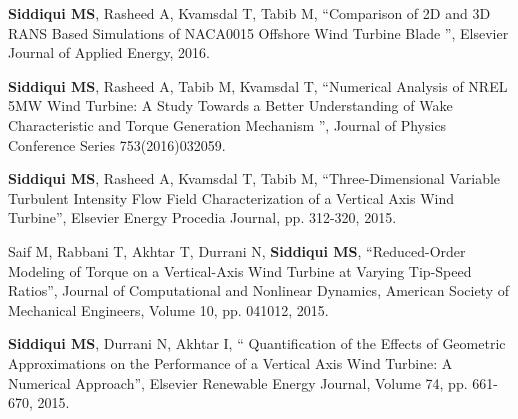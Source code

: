 \begin{cventries}
{\begin{cvitems}
			\item{\textbf{Siddiqui MS}, Rasheed A, Kvamsdal T, Tabib M, “Comparison of 2D and 3D RANS Based Simulations of NACA0015 Offshore Wind Turbine Blade  ”, Elsevier Journal of Applied Energy, 2016.}
			\item{\textbf{Siddiqui MS}, Rasheed A, Tabib M, Kvamsdal T, “Numerical Analysis of NREL 5MW Wind Turbine: A Study Towards a Better Understanding of Wake Characteristic and Torque Generation Mechanism ”, Journal of Physics Conference Series 753(2016)032059.}
			\item {\textbf{Siddiqui MS}, Rasheed A, Kvamsdal T, Tabib M, “Three-Dimensional Variable Turbulent Intensity Flow Field Characterization of a Vertical Axis Wind Turbine”, Elsevier Energy Procedia Journal, pp. 312-320, 2015.}
			\item {Saif M, Rabbani T, Akhtar T, Durrani N, \textbf{Siddiqui MS}, “Reduced-Order Modeling of Torque on a Vertical-Axis Wind Turbine at Varying Tip-Speed Ratios”, Journal of Computational and Nonlinear Dynamics, American Society of Mechanical Engineers, Volume 10, pp. 041012, 2015.}
			\item {\textbf{Siddiqui MS}, Durrani N, Akhtar I, “ Quantification of the Effects of Geometric Approximations on the Performance of a Vertical Axis Wind Turbine: A Numerical Approach”, Elsevier Renewable Energy Journal, Volume 74, pp. 661-670, 2015.}
		\end{cvitems}
	}
\end{cventries}
